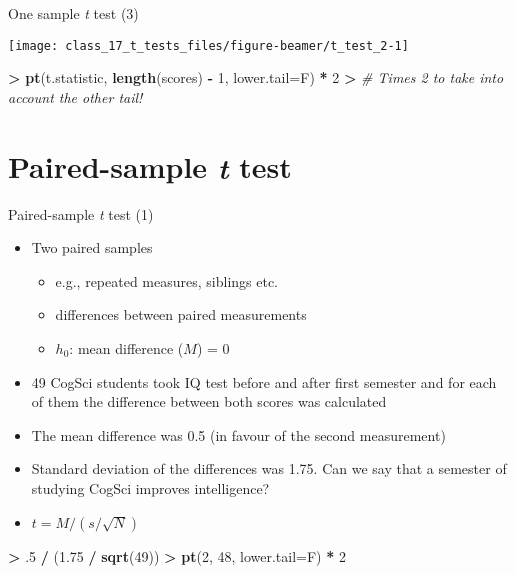 \documentclass[
  ignorenonframetext,
]{beamer}
\newenvironment{Shaded}{\begin{snugshade}}{\end{snugshade}}
\newcommand{\AttributeTok}[1]{\textcolor[rgb]{0.13,0.29,0.53}{#1}}
\newcommand{\CommentTok}[1]{\textcolor[rgb]{0.56,0.35,0.01}{\textit{#1}}}
\newcommand{\DecValTok}[1]{\textcolor[rgb]{0.00,0.00,0.81}{#1}}
\newcommand{\FloatTok}[1]{\textcolor[rgb]{0.00,0.00,0.81}{#1}}
\newcommand{\FunctionTok}[1]{\textcolor[rgb]{0.13,0.29,0.53}{\textbf{#1}}}
\newcommand{\NormalTok}[1]{#1}
\newcommand{\SpecialCharTok}[1]{\textcolor[rgb]{0.81,0.36,0.00}{\textbf{#1}}}
\providecommand{\tightlist}{%
  \setlength{\itemsep}{0pt}\setlength{\parskip}{0pt}}
\begin{document}
\begin{frame}[fragile]{One sample \emph{t} test (3)}
\label{one-sample-t-test-3}
\begin{center}\texttt{[image: class\_17\_t\_tests\_files/figure-beamer/t\_test\_2-1]} \end{center}

\begin{Shaded}
\begin{Highlighting}[]
\SpecialCharTok{\textgreater{}} \FunctionTok{pt}\NormalTok{(t.statistic, }\FunctionTok{length}\NormalTok{(scores) }\SpecialCharTok{{-}} \DecValTok{1}\NormalTok{, }\AttributeTok{lower.tail=}\NormalTok{F) }\SpecialCharTok{*} \DecValTok{2}
\SpecialCharTok{\textgreater{}} \CommentTok{\# Times 2 to take into account the other tail!}
\end{Highlighting}
\end{Shaded}
\end{frame}

\section{\texorpdfstring{Paired-sample \emph{t}
test}{Paired-sample t test}}\label{paired-sample-t-test}

\begin{frame}[fragile]{Paired-sample \emph{t} test (1)}
\label{paired-sample-t-test-1}
\begin{itemize}
\tightlist
\item
  Two paired samples

  \begin{itemize}
  \tightlist
  \item
    e.g., repeated measures, siblings etc.
  \item
    differences between paired measurements
  \item
    \(h_0\): mean difference (\(M\)) = 0
  \end{itemize}
\item
  49 CogSci students took IQ test before and after first semester and
  for each of them the difference between both scores was calculated
\item
  The mean difference was 0.5 (in favour of the second measurement)
\item
  Standard deviation of the differences was 1.75. Can we say that a
  semester of studying CogSci improves intelligence?
\item
  \(t = M / (s / \sqrt{N})\)
\end{itemize}

\begin{Shaded}
\begin{Highlighting}[]
\SpecialCharTok{\textgreater{}}\NormalTok{ .}\DecValTok{5} \SpecialCharTok{/}\NormalTok{ (}\FloatTok{1.75} \SpecialCharTok{/} \FunctionTok{sqrt}\NormalTok{(}\DecValTok{49}\NormalTok{))}
\SpecialCharTok{\textgreater{}} \FunctionTok{pt}\NormalTok{(}\DecValTok{2}\NormalTok{, }\DecValTok{48}\NormalTok{, }\AttributeTok{lower.tail=}\NormalTok{F) }\SpecialCharTok{*} \DecValTok{2}
\end{Highlighting}
\end{Shaded}
\end{frame}
\end{document}
